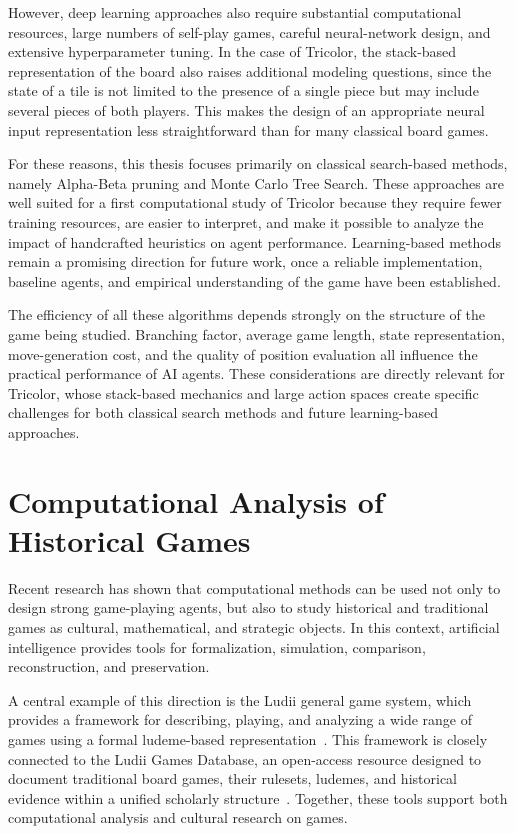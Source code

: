 However, deep learning approaches also require substantial computational resources, large numbers of self-play games, careful neural-network design, and extensive hyperparameter tuning. In the case of Tricolor, the stack-based representation of the board also raises additional modeling questions, since the state of a tile is not limited to the presence of a single piece but may include several pieces of both players. This makes the design of an appropriate neural input representation less straightforward than for many classical board games.

For these reasons, this thesis focuses primarily on classical search-based methods, namely Alpha-Beta pruning and Monte Carlo Tree Search. These approaches are well suited for a first computational study of Tricolor because they require fewer training resources, are easier to interpret, and make it possible to analyze the impact of handcrafted heuristics on agent performance. Learning-based methods remain a promising direction for future work, once a reliable implementation, baseline agents, and empirical understanding of the game have been established.

The efficiency of all these algorithms depends strongly on the structure of the game being studied. Branching factor, average game length, state representation, move-generation cost, and the quality of position evaluation all influence the practical performance of AI agents. These considerations are directly relevant for Tricolor, whose stack-based mechanics and large action spaces create specific challenges for both classical search methods and future learning-based approaches.

\section{Computational Analysis of Historical Games}

Recent research has shown that computational methods can be used not only to design strong game-playing agents, but also to study historical and traditional games as cultural, mathematical, and strategic objects. In this context, artificial intelligence provides tools for formalization, simulation, comparison, reconstruction, and preservation.

A central example of this direction is the Ludii general game system, which provides a framework for describing, playing, and analyzing a wide range of games using a formal ludeme-based representation~\cite{piette2020ludii_24th}. This framework is closely connected to the Ludii Games Database, an open-access resource designed to document traditional board games, their rulesets, ludemes, and historical evidence within a unified scholarly structure~\cite{crist2024ludii}. Together, these tools support both computational analysis and cultural research on games.

